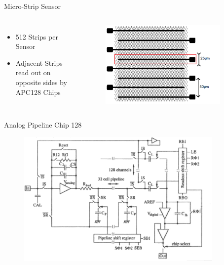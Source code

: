 \documentclass{beamer}
\begin{document}
\begin{frame}{Micro-Strip Sensor}
  \centering
  \begin{columns}
    \begin{itemize}
      \item 512 Strips per Sensor
      \item Adjacent Strips read out on opposite sides by APC128 Chips
    \end{itemize}
      \begin{figure}
        \includegraphics[width=0.9\textwidth]{figures/Microstrip_Sensor}
      \end{figure}
  \end{columns}
\end{frame}

\begin{frame}{Analog Pipeline Chip 128}
  \centering
  \begin{figure}
    \includegraphics[width=0.9\textwidth]{figures/APC128_Schematic}
  \end{figure}
\end{frame}
\end{document}
